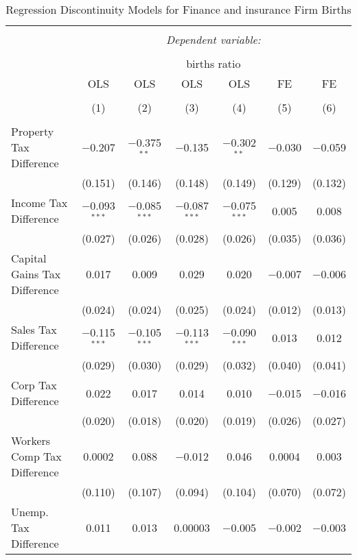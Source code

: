 
\begin{table}[!htbp] \centering 
  \caption{Regression Discontinuity Models for  Finance and insurance Firm Births} 
  \label{52rd} 
\footnotesize 
\begin{tabular}{@{\extracolsep{5pt}}lcccccc} 
\\[-1.8ex]\hline 
\hline \\[-1.8ex] 
 & \multicolumn{6}{c}{\textit{Dependent variable:}} \\ 
\cline{2-7} 
\\[-1.8ex] & \multicolumn{6}{c}{births ratio} \\ 
 & OLS & OLS & OLS & OLS & FE & FE \\ 
\\[-1.8ex] & (1) & (2) & (3) & (4) & (5) & (6)\\ 
\hline \\[-1.8ex] 
 Property Tax Difference & $-$0.207 & $-$0.375$^{**}$ & $-$0.135 & $-$0.302$^{**}$ & $-$0.030 & $-$0.059 \\ 
  & (0.151) & (0.146) & (0.148) & (0.149) & (0.129) & (0.132) \\ 
  Income Tax Difference & $-$0.093$^{***}$ & $-$0.085$^{***}$ & $-$0.087$^{***}$ & $-$0.075$^{***}$ & 0.005 & 0.008 \\ 
  & (0.027) & (0.026) & (0.028) & (0.026) & (0.035) & (0.036) \\ 
  Capital Gains Tax Difference & 0.017 & 0.009 & 0.029 & 0.020 & $-$0.007 & $-$0.006 \\ 
  & (0.024) & (0.024) & (0.025) & (0.024) & (0.012) & (0.013) \\ 
  Sales Tax Difference & $-$0.115$^{***}$ & $-$0.105$^{***}$ & $-$0.113$^{***}$ & $-$0.090$^{***}$ & 0.013 & 0.012 \\ 
  & (0.029) & (0.030) & (0.029) & (0.032) & (0.040) & (0.041) \\ 
  Corp Tax Difference & 0.022 & 0.017 & 0.014 & 0.010 & $-$0.015 & $-$0.016 \\ 
  & (0.020) & (0.018) & (0.020) & (0.019) & (0.026) & (0.027) \\ 
  Workers Comp Tax Difference & 0.0002 & 0.088 & $-$0.012 & 0.046 & 0.0004 & 0.003 \\ 
  & (0.110) & (0.107) & (0.094) & (0.104) & (0.070) & (0.072) \\ 
  Unemp. Tax Difference & 0.011 & 0.013 & 0.00003 & $-$0.005 & $-$0.002 & $-$0.003 \\ 

\end{tabular}
\end{table}
